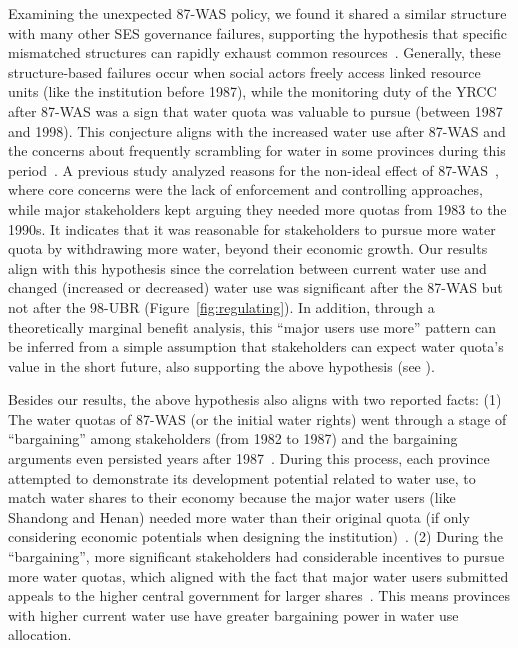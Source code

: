 Examining the unexpected 87-WAS policy, we found it shared a similar structure with many other SES governance failures, supporting the hypothesis that specific mismatched structures can rapidly exhaust common resources~\cite{kellenberg2009,cai2016,barnes2019}.
Generally, these structure-based failures occur when social actors freely access linked resource units (like the institution before 1987), while the monitoring duty of the YRCC after 87-WAS was a sign that water quota was valuable to pursue (between 1987 and 1998).
This conjecture aligns with the increased water use after 87-WAS and the concerns about frequently scrambling for water in some provinces during this period~\cite{mao2000, bouckaert2022}.
A previous study analyzed reasons for the non-ideal effect of 87-WAS~\cite{huangang2002}, where core concerns were the lack of enforcement and controlling approaches, while major stakeholders kept arguing they needed more quotas from 1983 to the 1990s.
It indicates that it was reasonable for stakeholders to pursue more water quota by withdrawing more water, beyond their economic growth.
Our results align with this hypothesis since the correlation between current water use and changed (increased or decreased) water use was significant after the 87-WAS but not after the 98-UBR (Figure~\ref{fig:regulating}).
In addition, through a theoretically marginal benefit analysis, this ``major users use more'' pattern can be inferred from a simple assumption that stakeholders can expect water quota's value in the short future, also supporting the above hypothesis (see \textit{}).

Besides our results, the above hypothesis also aligns with two reported facts:
(1) The water quotas of 87-WAS (or the initial water rights) went through a stage of ``bargaining'' among stakeholders (from 1982 to 1987) and the bargaining arguments even persisted years after 1987~\cite{wang2019e, wang2019d}.
During this process, each province attempted to demonstrate its development potential related to water use, to match water shares to their economy because the major water users (like Shandong and Henan) needed more water than their original quota (if only considering economic potentials when designing the institution)~\cite{zuo2020}.
(2) During the ``bargaining'', more significant stakeholders had considerable
incentives to pursue more water quotas, which aligned with the fact that major water users submitted appeals to the higher central government for larger shares~\cite{wang2019e, wang2019d}.
This means provinces with higher current water use have greater bargaining power in water use allocation.

